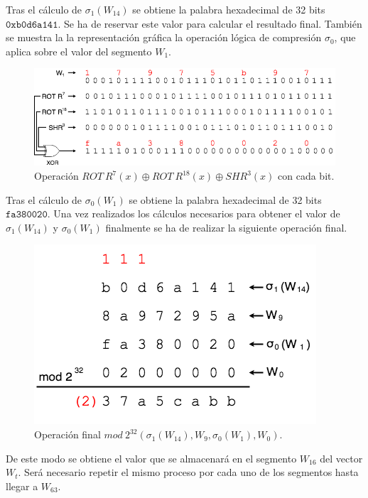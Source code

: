 \documentclass{article}
\begin{document}
        Tras el cálculo de $\sigma_{1}(W_{14})$ se obtiene la palabra hexadecimal de 32 bits $\texttt{0xb0d6a141}$. Se ha de reservar este valor para calcular el resultado final. También se muestra la la representación gráfica la operación lógica de compresión $\sigma_{0}$, que aplica sobre el valor del segmento $W_{1}$.
        
        \begin{figure}[H]
        \centering
            \includegraphics[scale=0.445]{img/SHA-256-Wt_operacion_sigma0.png}
            \caption{Operación $ROT \ R^{7}(x) \oplus ROT \ R^{18}(x) \oplus SHR^{3}(x)$ con cada bit.}
        \end{figure}
        
        Tras el cálculo de $\sigma_{0}(W_{1})$ se obtiene la palabra hexadecimal de 32 bits $\texttt{fa380020}$. Una vez realizados los cálculos necesarios para obtener el valor de $\sigma_{1}(W_{14})$ y $\sigma_{0}(W_{1})$ finalmente se ha de realizar la siguiente operación final.
        
        \begin{figure}[H]
        \centering
            \includegraphics[scale=0.445]{img/SHA-256-Wt_operacion_mod2_32_final.png}
            \caption{Operación final $mod \ 2^{32} (\sigma_{1}(W_{14}), W_{9}, \sigma_{0}(W_{1}), W_{0})$.}
        \end{figure}
        
        De este modo se obtiene el valor que se almacenará en el segmento $W_{16}$ del vector $W_t$. Será necesario repetir el mismo proceso por cada uno de los segmentos hasta llegar a $W_{63}$.
        
\end{document}
